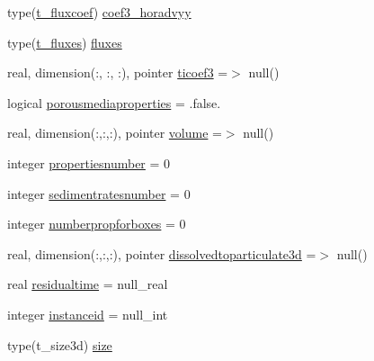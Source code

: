\begin{DoxyCompactItemize}
\item 
type(\mbox{\hyperlink{structmoduleporousmediaproperties_1_1t__fluxcoef}{t\+\_\+fluxcoef}}) \mbox{\hyperlink{structmoduleporousmediaproperties_1_1t__porousmediaproperties_ac312ce1b13b472b0f3ec82f8ff0c9fb6}{coef3\+\_\+horadvyy}}
\item 
type(\mbox{\hyperlink{structmoduleporousmediaproperties_1_1t__fluxes}{t\+\_\+fluxes}}) \mbox{\hyperlink{structmoduleporousmediaproperties_1_1t__porousmediaproperties_a2638fb9210725c6934a2fa410ed6875a}{fluxes}}
\item 
real, dimension(\+:, \+:, \+:), pointer \mbox{\hyperlink{structmoduleporousmediaproperties_1_1t__porousmediaproperties_ac2abc4b752b23ceea1f55cc26d5841e4}{ticoef3}} =$>$ null()
\item 
logical \mbox{\hyperlink{structmoduleporousmediaproperties_1_1t__porousmediaproperties_a207c4b763879d3e9f8ecf254c97243e1}{porousmediaproperties}} = .false.
\item 
real, dimension(\+:,\+:,\+:), pointer \mbox{\hyperlink{structmoduleporousmediaproperties_1_1t__porousmediaproperties_a7169623d6416fb20a43f7a60f67d2c52}{volume}} =$>$ null()
\item 
integer \mbox{\hyperlink{structmoduleporousmediaproperties_1_1t__porousmediaproperties_a7bd07e445d1a422ba271098600f7715c}{propertiesnumber}} = 0
\item 
integer \mbox{\hyperlink{structmoduleporousmediaproperties_1_1t__porousmediaproperties_ae1e5a127be1f26b7e5742242afeaa851}{sedimentratesnumber}} = 0
\item 
integer \mbox{\hyperlink{structmoduleporousmediaproperties_1_1t__porousmediaproperties_af6b0175e7e9fdf88948b10d37e0819b0}{numberpropforboxes}} = 0
\item 
real, dimension(\+:,\+:,\+:), pointer \mbox{\hyperlink{structmoduleporousmediaproperties_1_1t__porousmediaproperties_ae6be7109d38eaee6a02d909ef49da53a}{dissolvedtoparticulate3d}} =$>$ null()
\item 
real \mbox{\hyperlink{structmoduleporousmediaproperties_1_1t__porousmediaproperties_a92cad8ee72a234bfedd14c0fc961268b}{residualtime}} = null\+\_\+real
\item 
integer \mbox{\hyperlink{structmoduleporousmediaproperties_1_1t__porousmediaproperties_ad60396eb0c587ca077b564952c650d9b}{instanceid}} = null\+\_\+int
\item 
type(t\+\_\+size3d) \mbox{\hyperlink{structmoduleporousmediaproperties_1_1t__porousmediaproperties_abe3b3f873f97bcef61c7ce35781b285e}{size}}
\item 

\end{DoxyCompactItemize}
